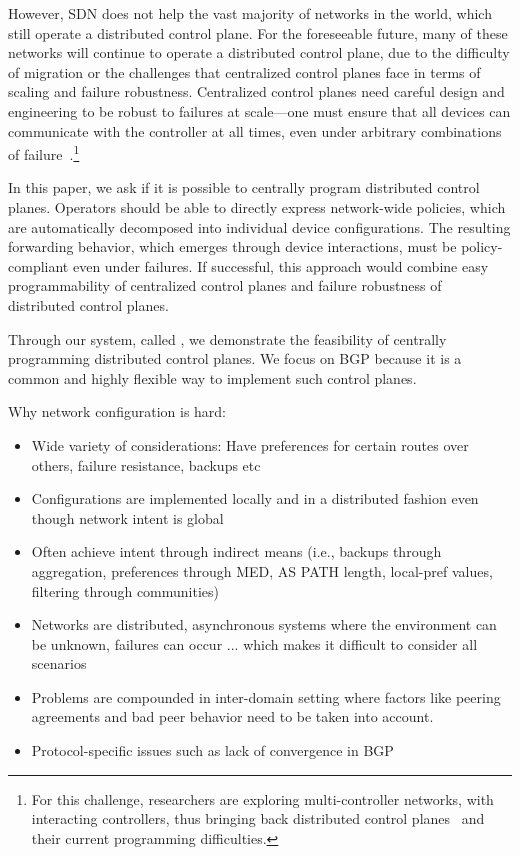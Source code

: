 However, SDN does not help the vast majority of networks in the world, which  still operate a distributed control plane. For the foreseeable future, many of these networks will continue to operate a distributed control plane, due to the difficulty of migration or the challenges that centralized control planes face in terms of scaling and failure robustness. 
Centralized control planes need careful design and engineering to be robust to failures at scale---one must ensure that all devices can communicate with the controller at all times, even under arbitrary combinations of failure~\cite{x,y,z}.\footnote{For this challenge, researchers are exploring multi-controller networks, with interacting controllers, thus bringing back distributed control planes~\cite{x,y,z} and their current programming difficulties.}

In this paper, we ask if it is possible to centrally program distributed control planes.
Operators should be able to directly express network-wide policies, which are automatically decomposed into individual device configurations. The resulting forwarding behavior, which emerges through device interactions, must be policy-compliant even under failures.
If successful, this approach would combine easy programmability of centralized control planes and failure robustness of distributed control planes.

Through our system, called \sysname, we demonstrate the feasibility of centrally programming distributed control planes. We focus on BGP because it is a common and highly flexible way to implement such control planes.



Why network configuration is hard:
\begin{itemize}
	\item Wide variety of considerations: Have preferences for certain routes over others, failure resistance, backups etc
	\item Configurations are implemented locally and in a distributed fashion even though network intent is global
	\item Often achieve intent through indirect means (i.e., backups through aggregation, preferences through MED, AS PATH length, local-pref values, filtering through communities)
	\item Networks are distributed, asynchronous systems where the environment can be unknown, failures can occur ... which makes it difficult to consider all scenarios
	\item Problems are compounded in inter-domain setting where factors like peering agreements and bad peer behavior need to be taken into account.
	\item Protocol-specific issues such as lack of convergence in BGP
\end{itemize}


